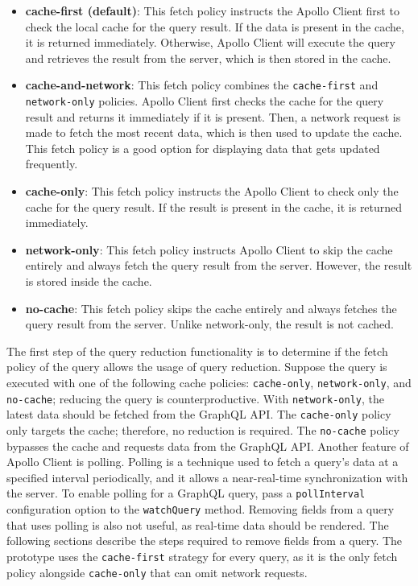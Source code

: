 \begin{itemize}
  \item \textbf{cache-first (default)}: This fetch policy instructs the Apollo Client first to check the local cache for the query result. If the data is present in the cache, it is returned immediately. Otherwise, Apollo Client will execute the query and retrieves the result from the server, which is then stored in the cache.
  \item \textbf{cache-and-network}: This fetch policy combines the \texttt{cache-first} and \texttt{network-only} policies. Apollo Client first checks the cache for the query result and returns it immediately if it is present. Then, a network request is made to fetch the most recent data, which is then used to update the cache. This fetch policy is a good option for displaying data that gets updated frequently.
  \item \textbf{cache-only}: This fetch policy instructs the Apollo Client to check only the cache for the query result. If the result is present in the cache, it is returned immediately.
  \item \textbf{network-only}: This fetch policy instructs Apollo Client to skip the cache entirely and always fetch the query result from the server. However, the result is stored inside the cache.
  \item \textbf{no-cache}: This fetch policy skips the cache entirely and always fetches the query result from the server. Unlike network-only, the result is not cached.
\end{itemize}

\noindent The first step of the query reduction functionality is to determine if the fetch policy of the query allows the usage of query reduction. Suppose the query is executed with one of the following cache policies: \texttt{cache-only}, \texttt{network-only}, and \texttt{no-cache}; reducing the query is counterproductive. With \texttt{network-only}, the latest data should be fetched from the GraphQL \ac{API}. The \texttt{cache-only} policy only targets the cache; therefore, no reduction is required. The \texttt{no-cache} policy bypasses the cache and requests data from the GraphQL \ac{API}. Another feature of Apollo Client is polling. Polling is a technique used to fetch a query's data at a specified interval periodically, and it allows a near-real-time synchronization with the server. To enable polling for a GraphQL query, pass a \texttt{pollInterval} configuration option to the \texttt{watchQuery} method. Removing fields from a query that uses polling is also not useful, as real-time data should be rendered. The following sections describe the steps required to remove fields from a query. The prototype uses the \texttt{cache-first} strategy for every query, as it is the only fetch policy alongside \texttt{cache-only} that can omit network requests.

